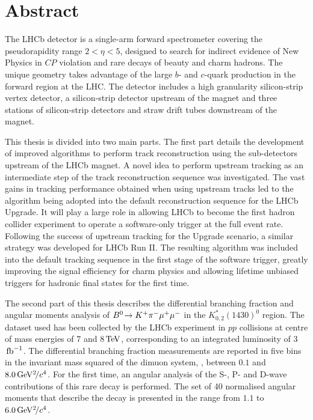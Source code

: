 \section*{Abstract}

The LHCb detector is a single-arm forward spectrometer covering the pseudorapidity range $2 < \eta < 5$, designed to search for indirect evidence of New Physics in $C\!P$ violation and rare decays of beauty and charm hadrons. The unique geometry takes advantage of the large $b$- and $c$-quark production in the forward region at the LHC. The detector includes a high granularity silicon-strip vertex detector, a silicon-strip detector upstream of the magnet and three stations of silicon-strip detectors and straw drift tubes downstream of the magnet.

This thesis is divided into two main parts. The first part details the development of improved algorithms to perform track reconstruction using the sub-detectors upstream of the LHCb magnet. A novel idea to perform upstream tracking as an intermediate step of the track reconstruction sequence was investigated. The vast gains in tracking performance obtained when using upstream tracks led to the algorithm being adopted into the default reconstruction sequence for the LHCb Upgrade. It will play a large role in allowing LHCb to become the first hadron collider experiment to operate a software-only trigger at the full event rate. Following the success of upstream tracking for the Upgrade scenario, a similar strategy was developed for LHCb Run II. The resulting algorithm was included into the default tracking sequence in the first stage of the software trigger, greatly improving the signal efficiency for charm physics and allowing lifetime unbiased triggers for hadronic final states for the first time.

The second part of this thesis describes the differential branching fraction and angular moments analysis of ${B}^0\!\rightarrow K^{+}\pi^{-}\mu^{+}\mu^{-}$ in the $K^{*}_{0,2}(1430)^{0}$ region. The dataset used has been collected by the LHCb experiment in $pp$ collisions at centre of mass energies of 7 and 8${\mathrm{\,Te\kern -0.1em V}}$, corresponding to an integrated luminosity of 3$\mbox{\,fb}^{-1}$. The differential branching fraction measurements are reported in five bins in the invariant mass squared of the dimuon system, \qsq, between $0.1$ and $8.0{\mathrm{\,Ge\kern -0.1em V^2\!/}c^4}$. For the first time, an angular analysis of the S-, P- and D-wave contributions of this rare decay is performed. The set of 40 normalised angular moments that describe the decay is presented in the \qsq range from $1.1$ to $6.0{\mathrm{\,Ge\kern -0.1em V^2\!/}c^4}$.